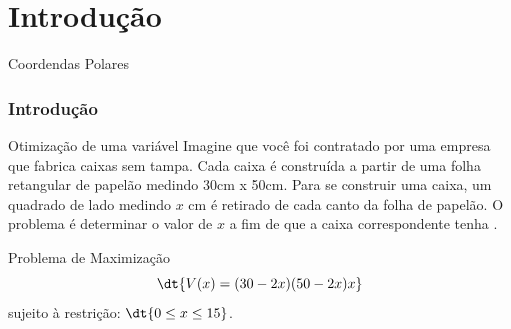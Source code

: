 \section{Introdução}

\begin{frame}[label=introducao]{Coordendas Polares}

\end{frame}


\begin{frame}[label=introducao]
\frametitle{Introdução}

\begin{block}{Otimização de uma variável}
Imagine que você foi contratado por uma empresa que fabrica caixas sem tampa. Cada caixa é construída a partir de uma folha retangular de papelão medindo 30cm x 50cm. Para se construir uma caixa, um quadrado de lado medindo $x$ cm é retirado de cada canto da folha de papelão. O problema é determinar o valor de $x$ a fim de que a caixa correspondente tenha . 
\end{block}



\begin{alertblock}{Problema de Maximização}
\[\dt{V(x)=(30-2x)(50-2x)x}\] 
sujeito à restrição: $\dt{0\leq x\leq 15}$.
\end{alertblock}

\end{frame}



